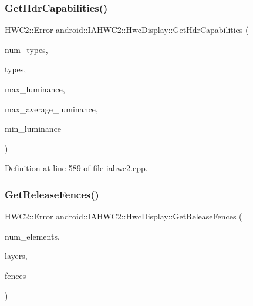 \subsubsection{\texorpdfstring{Get\+Hdr\+Capabilities()}{GetHdrCapabilities()}}
{\footnotesize\ttfamily H\+W\+C2\+::\+Error android\+::\+I\+A\+H\+W\+C2\+::\+Hwc\+Display\+::\+Get\+Hdr\+Capabilities (\begin{DoxyParamCaption}\item[{uint32\+\_\+t $\ast$}]{num\+\_\+types,  }\item[{int32\+\_\+t $\ast$}]{types,  }\item[{float $\ast$}]{max\+\_\+luminance,  }\item[{float $\ast$}]{max\+\_\+average\+\_\+luminance,  }\item[{float $\ast$}]{min\+\_\+luminance }\end{DoxyParamCaption})}



Definition at line 589 of file iahwc2.\+cpp.


\begin{DoxyCode}{0}
\end{DoxyCode}
\mbox{\label{classandroid_1_1IAHWC2_1_1HwcDisplay_a66f3567d548e8b875dd39697fe3f0015}} 
\subsubsection{\texorpdfstring{Get\+Release\+Fences()}{GetReleaseFences()}}
{\footnotesize\ttfamily H\+W\+C2\+::\+Error android\+::\+I\+A\+H\+W\+C2\+::\+Hwc\+Display\+::\+Get\+Release\+Fences (\begin{DoxyParamCaption}\item[{uint32\+\_\+t $\ast$}]{num\+\_\+elements,  }\item[{hwc2\+\_\+layer\+\_\+t $\ast$}]{layers,  }\item[{int32\+\_\+t $\ast$}]{fences }\end{DoxyParamCaption})}



